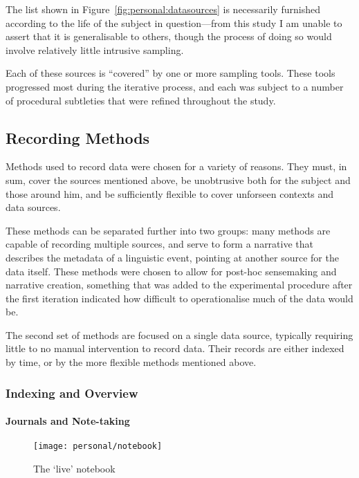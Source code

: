 The list shown in Figure~\ref{fig:personal:datasources} is necessarily furnished according to the life of the subject in question---from this study I am unable to assert that it is generalisable to others, though the process of doing so would involve relatively little intrusive sampling.

Each of these sources is ``covered'' by one or more sampling tools.  These tools progressed most during the iterative process, and each was subject to a number of procedural subtleties that were refined throughout the study.










\subsection{Recording Methods}
Methods used to record data were chosen for a variety of reasons.  They must, in sum, cover the sources mentioned above, be unobtrusive both for the subject and those around him, and be sufficiently flexible to cover unforseen contexts and data sources.

These methods can be separated further into two groups: many methods are capable of recording multiple sources, and serve to form a narrative that describes the metadata of a linguistic event, pointing at another source for the data itself.  These methods were chosen to allow for post-hoc sensemaking and narrative creation, something that was added to the experimental procedure after the first iteration indicated how difficult to operationalise much of the data would be.

The second set of methods are focused on a single data source, typically requiring little to no manual intervention to record data.  Their records are either indexed by time, or by the more flexible methods mentioned above.


\subsubsection{Indexing and Overview}
\paragraph{Journals and Note-taking}

\begin{figure}[p]
    \centering
    \texttt{[image: personal/notebook]}
    \caption{The `live' notebook}
    \label{fig:personal:online_notebook}
\end{figure}

